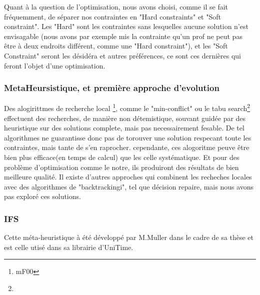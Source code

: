 Quant à la question de l'optimisation, nous avons choisi, comme il se fait fréquemment, de séparer nos contraintes en "Hard constraints" et "Soft constraint".  Les "Hard" sont les contraintes sans lesquelles aucune solution n'est envisagable (nous avons par exemple mis la contrainte qu'un prof ne peut pas être à deux endroits différent, comme une "Hard constraint"), et les "Soft Constraint" seront les désidéra et autres préférences, ce sont ces dernières qui feront l'objet d'une optimisation. 
\subsubsection{MetaHeursistique, et première approche d'evolution}
Des alogirittmes de recherche local \footnote{mF00}, comme le "min-conflict" ou le tabu search\footnote{} effectuent des recherches, de manière non détemistique, souvant guidée par des heuristique sur des solutions complete, mais pas necessairement fesable.  De tel algorithmes ne guarantisse donc pas de torouver une solution respecant toute les contraintes, mais tante de s'en raprocher. cependante, ces alogoritme peuve être bien plus efficace(en temps de calcul) que les celle systématique. Et pour des problème d'optimisation comme le notre, ils produiront des résultats de bien meilleure qualité.
Il existe d'autres approches qui combinent les recheches locales avec des algorithmes de "backtrackingi", tel que décision repaire, mais nous avons pas exploré ces solutions.

\subsubsection{IFS}
Cette méta-heuristique à été développé par M.Muller dans le cadre de sa thèse et est celle utisé dans sa librairie d'UniTime. 

